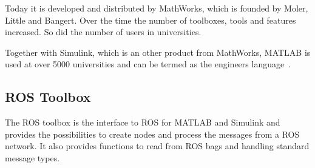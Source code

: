 Today it is developed and distributed by MathWorks, which is founded by Moler, Little and Bangert.
Over the time the number of toolboxes, tools and features increased.
So did the number of users in universities.

Together with Simulink, which is an other product from MathWorks, MATLAB is used at over 5000 universities and can be termed as the engineers language~\cite{introductionMatlab}.

\subsection{ROS Toolbox}\label{ssec:rosToolbox}
The \ac{ROS} toolbox is the interface to \ac{ROS} for MATLAB and Simulink and provides the possibilities to create nodes and process the messages from a \ac{ROS} network.
It also provides functions to read from \ac{ROS} bags and handling standard message types.

